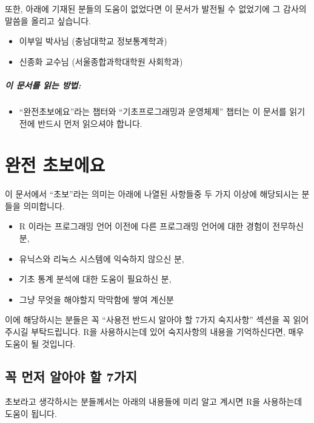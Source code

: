 \documentclass{book}
\begin{document}
또한, 아래에 기재된 분들의 도움이 없었다면 이 문서가 발전될 수 없었기에 그 감사의 말씀을 올리고 싶습니다. 
\begin{itemize}
\item 이부일 박사님 (충남대학교 정보통계학과)
\item 신종화 교수님 (서울종합과학대학원 사회학과)
\end{itemize}

\paragraph{이 문서를 읽는 방법:} 
\begin{itemize}
\item ``완전초보에요''라는 챕터와 ``기초프로그래밍과 운영체제'' 챕터는 이 문서를 읽기 전에 반드시 먼저 읽으셔야 합니다.  
\end{itemize}

%
%
%

\chapter{완전 초보에요}

이 문서에서 ``초보''라는 의미는 아래에 나열된 사항들중 두 가지 이상에 해당되시는 분들을 의미합니다. 

\begin{itemize}
\item R 이라는 프로그래밍 언어 이전에 다른 프로그래밍 언어에 대한 경험이 전무하신 분,
\item 유닉스와 리눅스 시스템에 익숙하지 않으신 분,
\item 기초 통계 분석에 대한 도움이 필요하신 분,
\item 그냥 무엇을 해야할지 막막함에 쌓여 계신분 
\end{itemize}

이에 해당하시는 분들은 꼭 ``사용전 반드시 알아야 할 7가지 숙지사항'' 섹션을 꼭 읽어주시길 부탁드립니다.
R을 사용하시는데 있어 숙지사항의 내용을 기억하신다면, 매우 도움이 될 것입니다. 


\section{꼭 먼저 알아야 할 7가지}

초보라고 생각하시는 분들께서는 아래의 내용들에 미리 알고 계시면 R을 사용하는데 도움이 됩니다.
\end{document}
